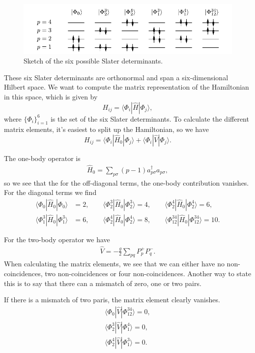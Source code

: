\documentclass[a4paper, 11pt, notitlepage, english]{article}
\newcommand{\op}[1]{\hat{#1}}
\newcommand{\braopket}[3]{\langle #1 | {#2} | #3 \rangle}
\begin{document}
\begin{figure}[htpb]
	\includegraphics[width=\textwidth]{project2b.pdf}
	\caption{Sketch of the six possible Slater determinants. \label{fig:2}}
\end{figure}

These six Slater determinants are orthonormal and span a six-dimensional Hilbert space. We want to compute the matrix representation of the Hamiltonian in this space, which is given by
$$H_{ij} = \braopket{\Phi_i}{\op{H}}{\Phi_j},$$
where $\{\Phi_i\}_{i=1}^6$ is the set of the six Slater determinants. To calculate the different matrix elements, it's easiest to split up the Hamiltonian, so we have
$$H_{ij} = \braopket{\Phi_i}{\op{H}_0}{\Phi_j} + \braopket{\Phi_i}{\op{V}}{\Phi_j}. $$

The one-body operator is
\begin{align*}
\op{H}_0 = \sum_{p\sigma} (p-1)a_{p\sigma}^\dagger a_{p\sigma},
\end{align*}
so we see that the for the off-diagonal terms, the one-body contribution vanishes. For the diagonal terms we find
\begin{align*}
\braopket{\Phi_0}{\op{H}_0}{\Phi_0} &= 2, \qquad \braopket{\Phi_2^3}{\op{H}_0}{\Phi_2^3} = 4, \qquad \braopket{\Phi_2^{4}}{\op{H}_0}{\Phi_2^{4}} = 6, \\
\braopket{\Phi_1^3}{\op{H}_0}{\Phi_1^{3}} &= 6, \qquad \braopket{\Phi_2^{4}}{\op{H}_0}{\Phi_2^{4}} = 8, \qquad \braopket{\Phi_{12}^{34}}{\op{H}_0}{\Phi_{12}^{34}} = 10.
\end{align*}

For the two-body operator we have
\begin{align*}
\op{V} = -\frac{g}{2}\sum_{pq} P_p^+ P_q^-.
\end{align*}
When calculating the matrix elements, we see that we can either have no non-coincidences, two non-coincidences or four non-coincidences. Another way to state this is to say that there can a mismatch of zero, one or two pairs. 

If there is a mismatch of two paris, the matrix element clearly vanishes.
\begin{align*}
\braopket{\Phi_0}{\op{V}}{\Phi_{12}^{34}} = 0, \\
\braopket{\Phi_2^3}{\op{V}}{\Phi_{1}^{4}} = 0, \\
\braopket{\Phi_2^4}{\op{V}}{\Phi_{1}^{3}} = 0. \\
\end{align*}
\end{document}
